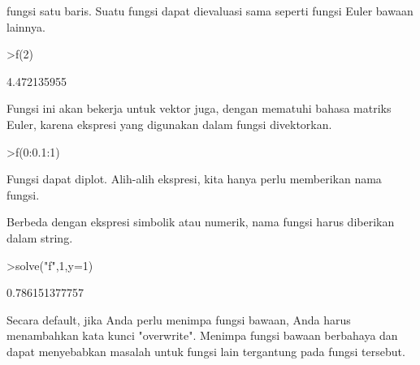\documentclass[a4paper,10pt]{article}
\begin{document}
\begin{eulernotebook}
\begin{eulercomment}
\begin{eulercomment}
\begin{eulercomment}
fungsi satu baris. Suatu fungsi dapat dievaluasi sama seperti fungsi
Euler bawaan lainnya.
\end{eulercomment}
\begin{eulerprompt}
>f(2)
\end{eulerprompt}
\begin{euleroutput}
  4.472135955
\end{euleroutput}
\begin{eulercomment}
Fungsi ini akan bekerja untuk vektor juga, dengan mematuhi bahasa
matriks Euler, karena ekspresi yang digunakan dalam fungsi
divektorkan.
\end{eulercomment}
\begin{eulerprompt}
>f(0:0.1:1)
\end{eulerprompt}
\begin{euleroutput}
  [0,  0.100499,  0.203961,  0.313209,  0.430813,  0.559017,  0.699714,
  0.854459,  1.0245,  1.21083,  1.41421]
\end{euleroutput}
\begin{eulercomment}
Fungsi dapat diplot. Alih-alih ekspresi, kita hanya perlu memberikan
nama fungsi.

Berbeda dengan ekspresi simbolik atau numerik, nama fungsi harus
diberikan dalam string.
\end{eulercomment}
\begin{eulerprompt}
>solve("f",1,y=1)
\end{eulerprompt}
\begin{euleroutput}
  0.786151377757
\end{euleroutput}
\begin{eulercomment}
Secara default, jika Anda perlu menimpa fungsi bawaan, Anda harus
menambahkan kata kunci "overwrite". Menimpa fungsi bawaan berbahaya
dan dapat menyebabkan masalah untuk fungsi lain tergantung pada fungsi
tersebut.


\end{eulercomment}
\end{eulercomment}
\end{eulercomment}
\end{eulernotebook}
\end{document}
